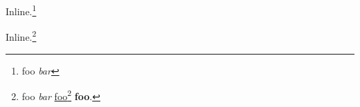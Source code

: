 Inline.\footnote{foo \emph{bar}}

Inline.\footnote{foo \emph{bar}
\href{/bar}{foo}\footnote{\href{/bar}{\slash bar}}
\textbf{foo}.}
